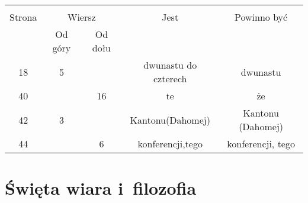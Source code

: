 \documentclass[a4paper,11pt]{article}
\begin{document}
\vspace{\spaceTwo}







%
%
%

\begin{center}
  \begin{tabular}{|c|c|c|c|c|}
    \hline
    & \multicolumn{2}{c|}{} & & \\
    Strona & \multicolumn{2}{c|}{Wiersz} & Jest
                              & Powinno być \\ \cline{2-3}
    & Od góry & Od dołu & & \\
    \hline
    18  &  5 & & dwunastu do czterech & dwunastu \\
    40  & & 16 & te & że \\
    42  &  3 & & Kantonu(Dahomej) & Kantonu (Dahomej) \\
    44  & &  6 & konferencji,tego & konferencji, tego \\
    \hline
  \end{tabular}
\end{center}











\newpage
\section{Święta wiara i~filozofia}

\vspace{\spaceTwo}



\end{document}

